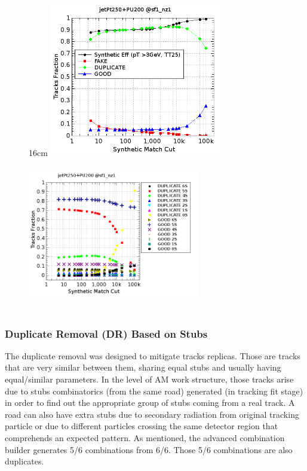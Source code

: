 \begin{figure}[htbp]{16cm}
	\includegraphics[width=7.5cm,height=6.7cm]{AppendixCMSL1TT/figs/final_plots/jet250pu200_synthetic_view}
	\includegraphics[width=7.5cm,height=6.7cm]{AppendixCMSL1TT/figs/final_plots/jet250pu200_analytic_view}
	\label{fig:chi2_match_optimization}
\end{figure}


\subsubsection{Duplicate Removal (DR) Based on Stubs}
The duplicate removal was designed to mitigate tracks replicas. Those are tracks that are very similar between them, sharing equal stubs and usually having equal/similar parameters. In the level of AM work structure, those tracks arise due to stubs combinatorics (from the same road) generated (in tracking fit stage) in order to find out the appropriate group of stubs coming from a real track. A road can also have extra stubs due to secondary radiation from original tracking particle or due to different particles crossing the same detector region that comprehends an expected pattern. As mentioned, the advanced combination builder generates 5/6 combinations from 6/6. Those 5/6 combinations are also duplicates. 

